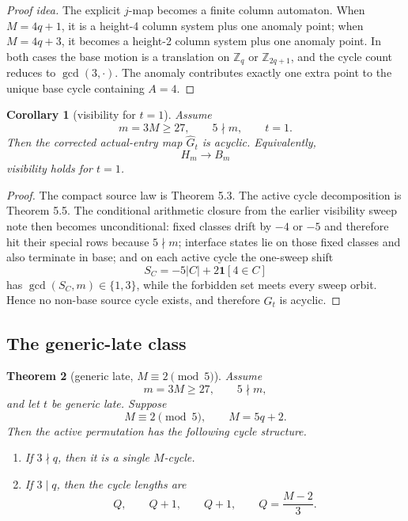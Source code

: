 \documentclass[11pt]{article}
\newtheorem{theorem}{Theorem}[section]
\newtheorem{corollary}[theorem]{Corollary}
\newcommand{\Z}{\mathbb Z}
\newcommand{\1}{\mathbf 1}
\newcommand{\Hm}{H_m}
\newcommand{\Bm}{B_m}
\newcommand{\Gt}{\widehat G_t}
\begin{document}
\begin{proof}[Proof idea]
The explicit \(j\)-map becomes a finite column automaton.
When \(M=4q+1\), it is a height-4 column system plus one anomaly point; when \(M=4q+3\), it becomes a height-2 column system plus one anomaly point.
In both cases the base motion is a translation on \(\Z_q\) or \(\Z_{2q+1}\), and the cycle count reduces to \(\gcd(3,\cdot)\).
The anomaly contributes exactly one extra point to the unique base cycle containing \(A=4\).
\end{proof}

\begin{corollary}[visibility for \(t=1\)]
Assume
\[
m=3M\ge 27,\qquad 5\nmid m,\qquad t=1.
\]
Then the corrected actual-entry map \(\Gt\) is acyclic.
Equivalently,
\[
\Hm \to \Bm
\]
visibility holds for \(t=1\).
\end{corollary}

\begin{proof}
The compact source law is Theorem 5.3.
The active cycle decomposition is Theorem 5.5.
The conditional arithmetic closure from the earlier visibility sweep note then becomes unconditional:
fixed classes drift by \(-4\) or \(-5\) and therefore hit their special rows because \(5\nmid m\); interface states lie on those fixed classes and also terminate in base; and on each active cycle the one-sweep shift
\[
S_C=-5|C|+2\1[4\in C]
\]
has \(\gcd(S_C,m)\in\{1,3\}\), while the forbidden set meets every sweep orbit.
Hence no non-base source cycle exists, and therefore \(\Gt\) is acyclic.
\end{proof}

\subsection{The generic-late class}

\begin{theorem}[generic late, \(M\equiv 2\pmod 5\)]
Assume
\[
m=3M\ge 27,\qquad 5\nmid m,
\]
and let \(t\) be generic late. Suppose
\[
M\equiv 2 \pmod 5,\qquad M=5q+2.
\]
Then the active permutation has the following cycle structure.
\begin{enumerate}[label=\textup{(\arabic*)},leftmargin=2.8em]
\item If \(3\nmid q\), then it is a single \(M\)-cycle.
\item If \(3\mid q\), then the cycle lengths are
\[
Q,\qquad Q+1,\qquad Q+1,
\qquad
Q=\frac{M-2}{3}.
\]
\end{enumerate}
\end{theorem}
\end{document}
